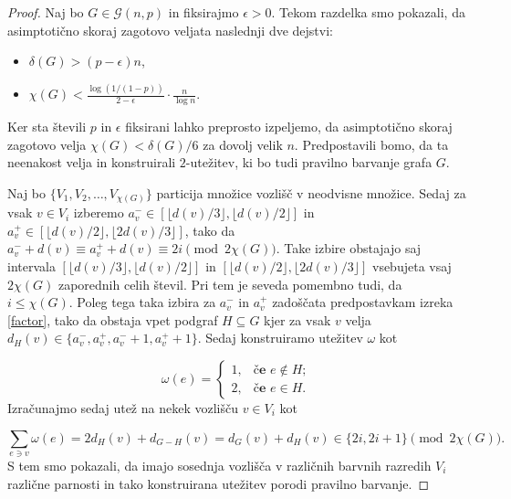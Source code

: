 \documentclass[12pt,a4paper,twoside]{article}
\theoremstyle{definition} %
\theoremstyle{plain} %
\numberwithin{equation}{section}  %
\begin{document}
\begin{proof}
Naj bo $G \in \mathcal{G}(n,p)$ in fiksirajmo $\epsilon > 0$. Tekom razdelka smo pokazali, da asimptotično skoraj zagotovo veljata naslednji dve dejstvi:
\begin{itemize}
\item $\delta(G)> (p- \epsilon)n$,

\item $\chi(G) < \frac{\log(1/(1-p))}{2 - \epsilon} \cdot \frac{ n}{\log n}.$
\end{itemize}
Ker sta števili $p$ in $\epsilon$ fiksirani lahko preprosto izpeljemo, da asimptotično skoraj zagotovo velja $ \chi(G) < \delta(G) / 6$ za dovolj velik $n$. Predpostavili bomo, da ta neenakost velja in konstruirali $2$-utežitev, ki bo tudi pravilno barvanje grafa $G$.

Naj bo $\{ V_1, V_2, \ldots, V_{\chi(G)}\}$ particija množice vozlišč v neodvisne množice. Sedaj za vsak $v \in V_i$ izberemo $a_v^- \in [ \lfloor d(v)/3 \rfloor,\lfloor d(v)/2 \rfloor]$ in $a_v^+ \in [ \lfloor d(v)/2 \rfloor,\lfloor 2d(v)/3 \rfloor]$, tako da $a_v^- + d(v) \equiv a_v^+ +  d(v) \equiv 2i \pmod{2\chi(G)}$. Take izbire obstajajo saj intervala $ [ \lfloor d(v)/3 \rfloor,\lfloor d(v)/2 \rfloor]$ in $ [ \lfloor d(v)/2 \rfloor,\lfloor 2d(v)/3 \rfloor]$ vsebujeta vsaj $2\chi(G)$ zaporednih celih števil. Pri tem je seveda pomembno tudi, da $i \le \chi(G)$. Poleg tega taka izbira za $a_v^-$ in $a_v^+$ zadoščata predpostavkam izreka \ref{factor}, tako da obstaja vpet podgraf $H \subseteq G$ kjer za vsak $v$ velja $d_H(v) \in \{a_v^-,a_v^+,a_v^- + 1 ,a_v^+ + 1\}$. Sedaj konstruiramo utežitev $\omega$ kot 

$$ \omega(e) = \begin{cases}
	1, & \textbf{če } e \notin H ;\\ 
	2, &\textbf{če } e \in H .
	\end{cases} $$
Izračunajmo sedaj utež na nekek vozlišču $v \in V_i$ kot

$$ \sum_{e \ni v} \omega(e) = 2 d_H(v) + d_{G-H}(v) = d_{G}(v) + d_H(v) \in \{2i, 2i + 1\} \pmod{2\chi(G)}.$$
S tem smo pokazali, da imajo sosednja vozlišča v različnih barvnih razredih $V_i$ različne parnosti in tako konstruirana utežitev porodi pravilno barvanje.
\end{proof}
\end{document}
